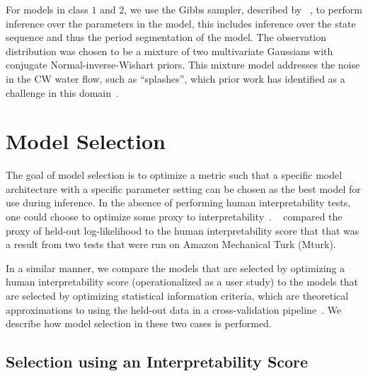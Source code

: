\documentclass[letterpaper]{article} %
\newcommand{\citename}[1]{\citeauthor{#1}~\shortcite{#1}}
\newcommand{\kibitz}[2]{\ifnum\Comments=1{\textcolor{#1}{#2}}\fi}
\newcommand{\nh}[1]{\kibitz{blue}{[NH:#1]}}
\begin{document}
For models in class $1$ and $2$, we use the Gibbs sampler, described by \citename{fox2008hdp}, to perform inference over the parameters in the model, this includes inference over the state sequence and thus the period segmentation of the model. The observation distribution was chosen to be a mixture of two multivariate Gaussians with conjugate Normal-inverse-Wishart priors. This mixture model addresses the noise in the CW water flow, such as ``splashes'', which prior work has identified as a challenge in this domain~\cite{hoernle2018modeling}.

\section{Model Selection}
\label{sec:model_selection}
The goal of model selection is to optimize a metric such that a specific model architecture with a specific parameter setting can be chosen as the best model for use during inference.
In the absence of performing human interpretability tests, one could choose to optimize some proxy to interpretability~\cite{doshi2017roadmap,lage2018human}. \citename{chang2009reading} compared the proxy of held-out log-likelihood to the human interpretability score that that was a result from two tests that were run on Amazon Mechanical Turk (Mturk).

In a similar manner, we compare the models that are selected by optimizing a human interpretability score  (operationalized as a user  study) to the models that are selected by optimizing statistical information criteria, which are theoretical approximations to using the held-out data in a cross-validation pipeline~\cite{gelman2013bayesian}.
We describe how model selection in these two cases is performed.

\subsection{Selection using an Interpretability Score}
\end{document}
